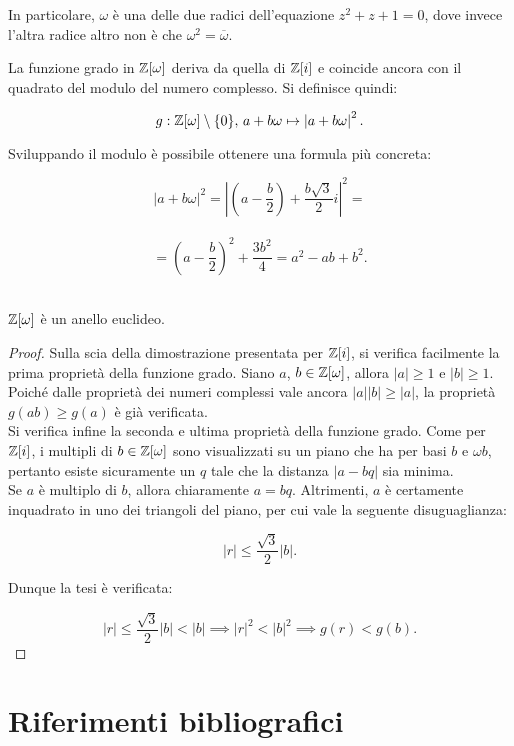 \documentclass[11pt]{scrbook}
\begin{document}
In particolare, $\omega$ è una delle due radici dell'equazione
$z^2 + z + 1 = 0$, dove invece l'altra radice altro non è che
$\omega^2 = \overline{\omega}$.

\vskip 0.1in

La funzione grado in $\mathbb Z[\omega]$ deriva da quella di $\mathbb Z[i]$ e coincide ancora
con il quadrato del modulo del numero complesso. Si definisce quindi:

\[g : \mathbb Z[\omega] \setminus \{0\}, \, a+b\omega \mapsto \left|a+b\omega\right|^2.\]

Sviluppando il modulo è possibile ottenere una formula più concreta:

\[ \left|a+b\omega\right|^2 = \left|\left(a-\frac{b}{2}\right) + \frac{b\sqrt{3}}{2}i\right|^2 =\] \\

\[= \left(a-\frac{b}{2}\right)^2 + \frac{3b^2}{4} = a^2 - ab + b^2.\] \\

\begin{theorem}
    $\mathbb Z[\omega]$ è un anello euclideo.
\end{theorem}

\begin{proof}
    Sulla scia della dimostrazione presentata per $\mathbb Z[i]$, si verifica facilmente
    la prima proprietà della funzione grado. Siano $a$, $b \in \mathbb Z[\omega]$, allora
    $\left|a\right| \geq 1$ e $\left|b\right| \geq 1$. Poiché dalle proprietà
    dei numeri complessi vale ancora $\left|a\right| \left|b\right| \geq \left|a\right|$,
    la proprietà $g(ab) \geq g(a)$ è già verificata. \\

    Si verifica infine la seconda e ultima proprietà della funzione grado. Come per
    $\mathbb Z[i]$, i multipli di $b \in \mathbb Z[\omega]$ sono visualizzati su un piano che
    ha per basi $b$ e $\omega b$, pertanto
    esiste sicuramente un $q$ tale che la distanza $\left|a-bq\right|$ sia minima. \\

    Se $a$ è multiplo di $b$, allora chiaramente $a = bq$. Altrimenti, $a$ è certamente
    inquadrato in uno dei triangoli del piano, per cui vale la seguente disuguaglianza:

    \[\left|r\right| \leq \frac{\sqrt{3}}{2} \left|b\right|.\]

    Dunque la tesi è verificata:

    \[\left|r\right| \leq \frac{\sqrt{3}}{2} \left|b\right| < \left|b\right| \implies \left|r\right|^2 < \left|b\right|^2 \implies g(r) < g(b). \]
\end{proof}

\chapter{Riferimenti bibliografici}
\printbibliography[heading=none]
\end{document}
